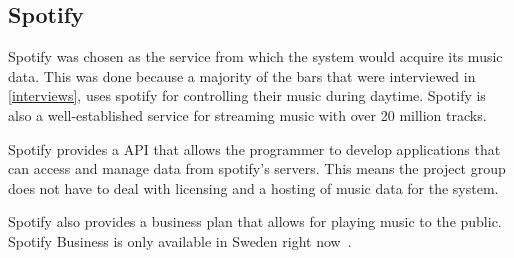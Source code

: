 \subsection{Spotify}
\label{sub:spotify}
Spotify was chosen as the service from which the system would acquire its music data. This was done because a majority of the bars that were interviewed in \cref{interviews}, uses spotify for controlling their music during daytime. Spotify is also a well-established service for streaming music with over 20 million tracks.

Spotify provides a API that allows the programmer to develop applications that can access and manage data from spotify’s servers. This means the project group does not have to deal with licensing and a hosting of music data for the system.

Spotify also provides a business plan that allows for playing music to the public. Spotify Business is only available in Sweden right now~\cite{spotifyBusiness}.

